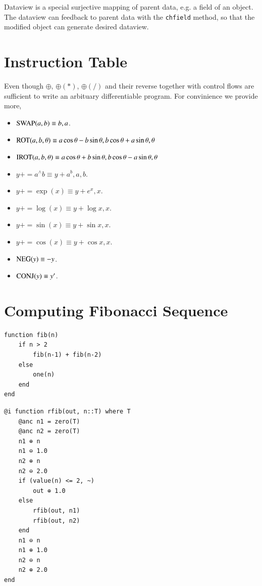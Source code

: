 \documentclass[aps,twocolumn,longbibliography,english,superscriptaddress,prr]{revtex4-1}
\newcommand{\<}{\langle}
\renewcommand{\>}{\rangle}
\begin{document}
Dataview is a special surjective mapping of parent data, e.g. a field of an object.
The dataview can feedback to parent data with the 
\texttt{chfield} method, so that the modified object can generate desired dataview.

\section{Instruction Table}\label{app:instr}
Even though \texttt{$\oplus$}, \texttt{$\oplus(*)$}, \texttt{$\oplus(/)$} and their reverse together with control flows are sufficient to write an arbituary differentiable program.
For convinience we provide more,
\begin{itemize}
    \item ${\rm SWAP}(a, b) \equiv b, a$.
    \item ${\rm ROT}(a, b, \theta) \equiv a \cos\theta - b\sin\theta, b \cos\theta + a\sin\theta, \theta$
    \item ${\rm IROT}(a, b, \theta) \equiv a \cos\theta + b\sin\theta, b \cos\theta - a\sin\theta, \theta$
    \item $y += a^\wedge b \equiv y+a^b, a, b$.
    \item $y += \exp(x) \equiv y+e^x, x$.
    \item $y += \log(x) \equiv y+\log x, x$.
    \item $y += \sin(x) \equiv y+\sin x, x$.
    \item $y += \cos(x) \equiv y+\cos x, x$.
    \item ${\rm NEG}(y) \equiv -y$.
    \item ${\rm CONJ}(y) \equiv y'$.
\end{itemize}

\section{Computing Fibonacci Sequence}\label{app:fib}
\begin{minipage}{.44\textwidth}
\begin{lstlisting}
function fib(n)
    if n > 2
        fib(n-1) + fib(n-2)
    else
        one(n)
    end
end
\end{lstlisting}
\end{minipage}

\begin{minipage}{.44\textwidth}
\begin{lstlisting}
@i function rfib(out, n::T) where T
    @anc n1 = zero(T)
    @anc n2 = zero(T)
    n1 ⊕ n
    n1 ⊖ 1.0
    n2 ⊕ n
    n2 ⊖ 2.0
    if (value(n) <= 2, ~)
        out ⊕ 1.0
    else
        rfib(out, n1)
        rfib(out, n2)
    end
    n1 ⊖ n
    n1 ⊕ 1.0
    n2 ⊖ n
    n2 ⊕ 2.0
end
\end{lstlisting}
\end{minipage}
\end{document}
